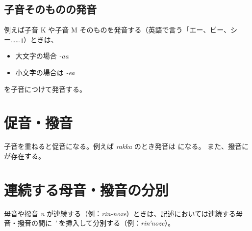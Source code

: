 \subsection{子音そのものの発音}

例えば子音 K や子音 M そのものを発音する（英語で言う「エー、ビー、シー……」）ときは、
\begin{itemize}
    \item 大文字の場合 \emph{-aa}
    \item 小文字の場合は \emph{-ea}
\end{itemize}
を子音につけて発音する。

\section{促音・撥音}

子音を重ねると促音になる。例えば \emph{rakka} のとき発音は  になる。
また、撥音に  が存在する。

\section{連続する母音・撥音の分別}

母音や撥音 \emph{n} が連続する（例：\emph{rin-noze}）ときは、記述においては連続する母音・撥音の間に \emph{'} を挿入して分別する（例：\emph{rin'noze}）。